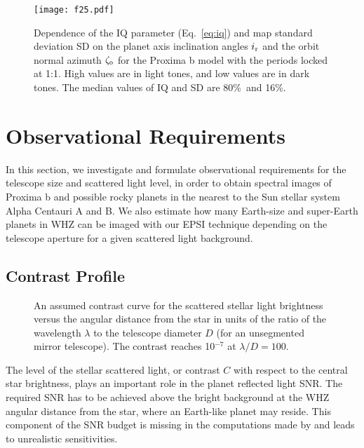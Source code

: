 \documentclass{emulateapj}
\begin{document}
\begin{figure}
\centering
\texttt{[image: f25.pdf]}
\caption{Dependence of the IQ parameter (Eq.~\ref{eq:iq}) and map standard deviation SD
on the planet axis inclination angles $i_{\rm r}$ and the orbit normal azimuth 
$\zeta_{\rm o}$ for the Proxima b model with the periods locked at 1:1. 
High values are in light tones, and low values are in dark tones.
The median values of IQ and SD are 80\%\ and 16\%.}
\label{fig:prox_iq}
\end{figure}

\section{Observational Requirements}\label{sec:tel}

In this section, we investigate and formulate observational requirements
for the telescope size and scattered light level, in order to obtain spectral images
of Proxima b and possible rocky planets in the nearest to the Sun stellar system 
Alpha Centauri A and B.  
We also estimate how many Earth-size and super-Earth planets in WHZ can be imaged with our 
EPSI technique depending on the telescope aperture for a given scattered light 
background.

\subsection{Contrast Profile}\label{sec:contrast}

\begin{figure}
\centering
{}
\caption{An assumed contrast curve for the scattered stellar light brightness 
versus the angular distance from the star in units of the ratio 
of the wavelength $\lambda$ to the telescope diameter $D$ 
(for an unsegmented mirror telescope).
The contrast reaches 10$^{-7}$ at $\lambda/D=100$.
}
\label{fig:psf}
\end{figure}

The level of the stellar scattered light, or contrast $C$
with respect to the central star brightness, 
plays an important role in the planet reflected light SNR. 
The required SNR has to be achieved above the bright background at 
the WHZ angular distance from the star, where an Earth-like planet may reside. 
This component of the SNR budget is missing in the computations 
made by \cite{fk12} and leads to unrealistic sensitivities.
\end{document}
